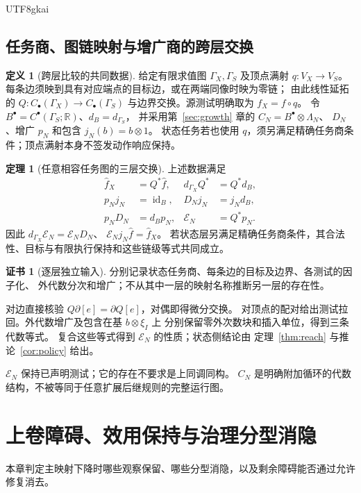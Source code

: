 \documentclass[12pt]{report}
\makeatletter
\theoremstyle{definition}
\newtheorem{definition}{定义}[chapter]
\newtheorem{theorem}{定理}[chapter]
\newtheorem{Certificate}{证书}[chapter]
\renewenvironment{proof}[1][\proofname]{\par
  \pushQED{\qed}\normalfont
  \topsep6\p@\@plus6\p@\relax
  \trivlist
  \item[\hskip\labelsep\normalfont #1\@addpunct{.}]\ignorespaces
}{
  \popQED\endtrivlist\@endpefalse
}
\newcommand{\RR}{\mathbb R}
\newcommand{\id}{\operatorname{id}}
\makeatother
\begin{document}
\begin{CJK*}{UTF8}{gkai}
\section{任务商、图链映射与增广商的跨层交换}
\label{sec:cross-layer}
\begin{definition}[跨层比较的共同数据]
\label{def:cross-layer-data}
给定有限求值图 \(\Gamma_X,\Gamma_S\) 及顶点满射 \(q:V_X\to V_S\)。
每条边须映到具有对应端点的目标边，或在两端同像时映为零链；
由此线性延拓的 \(Q:C_\bullet(\Gamma_X)\to C_\bullet(\Gamma_S)\)
与边界交换。源测试明确取为 \(f_X=f\circ q\)。
令 \(B^\bullet=C^\bullet(\Gamma_S;\RR)\)、\(d_B=d_{\Gamma_S}\)，
并采用第~\ref{sec:growth} 章的 \(C_N=B^\bullet\otimes\Lambda_N\)、
\(D_N\)、增广 \(p_N\) 和包含 \(j_N(b)=b\otimes1\)。
状态任务若也使用 \(q\)，须另满足精确任务商条件；顶点满射本身不签发动作响应保持。
\end{definition}
\begin{theorem}[任意相容任务图的三层交换]
\label{thm:cross-layer}
上述数据满足
\[
\begin{aligned}
\widehat f_X&=Q^*\widehat f,&d_{\Gamma_X}Q^*&=Q^*d_B,\\
p_Nj_N&=\id_B,&D_Nj_N&=j_Nd_B,\\
p_ND_N&=d_Bp_N,&\mathcal E_N&=Q^*p_N.
\end{aligned}
\]
因此 \(d_{\Gamma_X}\mathcal E_N=\mathcal E_ND_N\)、
\(\mathcal E_Nj_N\widehat f=\widehat f_X\)。
若状态层另满足精确任务商条件，其合法性、目标与有限执行保持和这些链级等式共同成立。
\end{theorem}
\begin{Certificate}[逐层独立输入]
分别记录状态任务商、每条边的目标及边界、各测试的因子化、
外代数分次和增广；不从其中一层的映射名称推断另一层的存在性。
\end{Certificate}
\begin{proof}
对边直接核验 \(Q\partial[e]=\partial Q[e]\)，对偶即得微分交换。
对顶点的配对给出测试拉回。外代数增广及包含在基 \(b\otimes\xi_I\) 上
分别保留零外次数块和插入单位，得到三条代数等式。
复合这些等式得到 \(\mathcal E_N\) 的性质；状态侧结论由
定理~\ref{thm:reach} 与推论~\ref{cor:policy} 给出。
\end{proof}
\(\mathcal E_N\) 保持已声明测试；它的存在不要求是上同调同构。
\(C_N\) 是明确附加循环的代数结构，不被等同于任意扩展后继规则的完整运行图。


\chapter{上卷障碍、效用保持与治理分型消隐}
\label{sec:utility-erasure}
本章判定主映射下降时哪些观察保留、哪些分型消隐，以及剩余障碍能否通过允许修复消去。

\end{CJK*}
\end{document}
